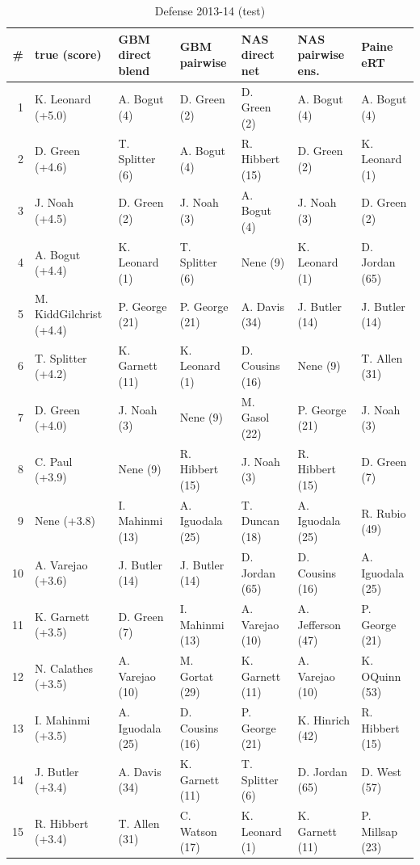 \documentclass[10pt]{article}
\begin{document}
\begin{table}[ht]\centering\scriptsize
\caption{Defense 2013-14 (test)}
\begin{tabular}{rllllll}
\toprule
\# & true (score) & GBM direct blend & GBM pairwise & NAS direct net & NAS pairwise ens. & Paine eRT \\
\midrule
1 & K. Leonard (+5.0) & A. Bogut (4) & D. Green (2) & D. Green (2) & A. Bogut (4) & A. Bogut (4) \\
2 & D. Green (+4.6) & T. Splitter (6) & A. Bogut (4) & R. Hibbert (15) & D. Green (2) & K. Leonard (1) \\
3 & J. Noah (+4.5) & D. Green (2) & J. Noah (3) & A. Bogut (4) & J. Noah (3) & D. Green (2) \\
4 & A. Bogut (+4.4) & K. Leonard (1) & T. Splitter (6) & Nene (9) & K. Leonard (1) & D. Jordan (65) \\
5 & M. KiddGilchrist (+4.4) & P. George (21) & P. George (21) & A. Davis (34) & J. Butler (14) & J. Butler (14) \\
6 & T. Splitter (+4.2) & K. Garnett (11) & K. Leonard (1) & D. Cousins (16) & Nene (9) & T. Allen (31) \\
7 & D. Green (+4.0) & J. Noah (3) & Nene (9) & M. Gasol (22) & P. George (21) & J. Noah (3) \\
8 & C. Paul (+3.9) & Nene (9) & R. Hibbert (15) & J. Noah (3) & R. Hibbert (15) & D. Green (7) \\
9 & Nene (+3.8) & I. Mahinmi (13) & A. Iguodala (25) & T. Duncan (18) & A. Iguodala (25) & R. Rubio (49) \\
10 & A. Varejao (+3.6) & J. Butler (14) & J. Butler (14) & D. Jordan (65) & D. Cousins (16) & A. Iguodala (25) \\
11 & K. Garnett (+3.5) & D. Green (7) & I. Mahinmi (13) & A. Varejao (10) & A. Jefferson (47) & P. George (21) \\
12 & N. Calathes (+3.5) & A. Varejao (10) & M. Gortat (29) & K. Garnett (11) & A. Varejao (10) & K. OQuinn (53) \\
13 & I. Mahinmi (+3.5) & A. Iguodala (25) & D. Cousins (16) & P. George (21) & K. Hinrich (42) & R. Hibbert (15) \\
14 & J. Butler (+3.4) & A. Davis (34) & K. Garnett (11) & T. Splitter (6) & D. Jordan (65) & D. West (57) \\
15 & R. Hibbert (+3.4) & T. Allen (31) & C. Watson (17) & K. Leonard (1) & K. Garnett (11) & P. Millsap (23) \\
\bottomrule
\end{tabular}
\end{table}
\end{document}
